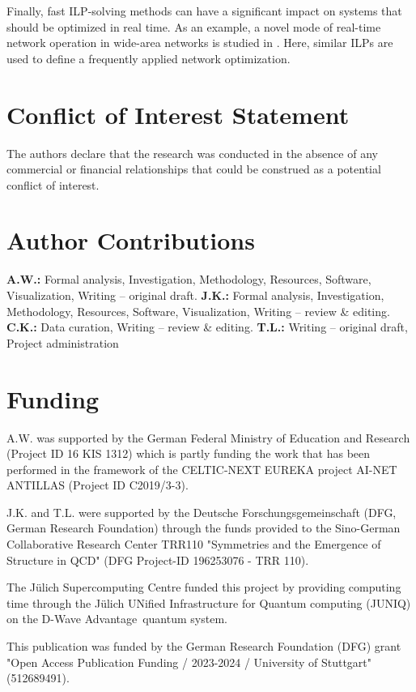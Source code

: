 \documentclass[utf8, nocrop]{FrontiersinHarvardArxiv}
\begin{document}
Finally, fast ILP-solving methods can have a significant impact on systems that should be optimized in real time. As an example, a novel mode of real-time network operation in wide-area networks is studied in \cite{Witt_HPSR}. Here, similar ILPs are used to define a frequently applied network optimization.

\section*{Conflict of Interest Statement}
The authors declare that the research was conducted in the absence of any commercial or financial relationships that could be construed as a potential conflict of interest.

\section*{Author Contributions}
\textbf{A.W.:} Formal analysis, Investigation, Methodology, Resources, Software, Visualization, Writing -- original draft.
\textbf{J.K.:} Formal analysis, Investigation, Methodology, Resources, Software, Visualization, Writing -- review \& editing.
\textbf{C.K.:} Data curation, Writing -- review \& editing.
\textbf{T.L.: } Writing -- original draft,
Project administration

\section*{Funding}
A.W. was supported by the German Federal Ministry of Education and Research (Project ID 16 KIS 1312) which is partly funding the work that has been performed in the framework of the CELTIC-NEXT EUREKA project AI-NET ANTILLAS (Project ID C2019/3-3).

J.K. and T.L. were supported by the Deutsche Forschungsgemeinschaft (DFG, German Research Foundation) through the funds provided to the Sino-German Collaborative Research Center TRR110 "Symmetries and the Emergence of Structure in QCD" (DFG Project-ID 196253076 - TRR 110).

The Jülich Supercomputing Centre funded this project by providing computing time through the Jülich UNified Infrastructure for Quantum computing (JUNIQ) on the D-Wave Advantage\texttrademark\ quantum system.

This publication was funded by the German Research Foundation (DFG) grant "Open Access Publication Funding / 2023-2024 / University of Stuttgart" (512689491).
\end{document}
